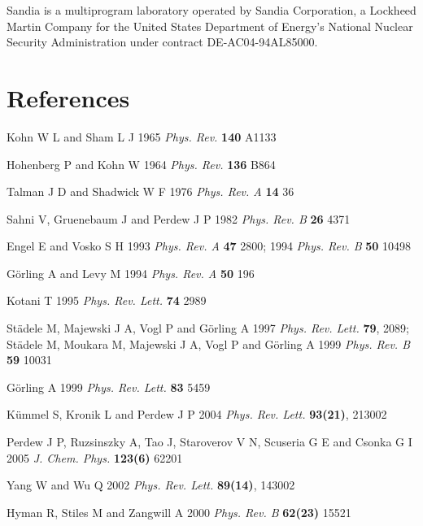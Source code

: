 \documentclass[12pt]{iopart}
\begin{document}
Sandia is a multiprogram laboratory operated by Sandia Corporation, a
Lockheed Martin Company for the United States Department of Energy's
National Nuclear Security Administration under contract DE-AC04-94AL85000.


%
%

\section*{References}

\begin{thebibliography}{14}

Kohn W L and Sham L J 1965 {\it Phys. Rev.} {\bf 140} A1133

Hohenberg P and Kohn W 1964 {\it Phys. Rev.} {\bf 136} B864

Talman J D and Shadwick W F 1976 {\it Phys. Rev. A} {\bf 14} 36

Sahni V, Gruenebaum J and Perdew J P 1982 {\it Phys. Rev. B} {\bf 26} 4371

Engel E and Vosko S H 1993 {\it Phys. Rev. A} {\bf 47} 2800;
1994 {\it Phys. Rev. B} {\bf 50} 10498

G\"{o}rling A and Levy M 1994 {\it Phys. Rev. A} {\bf 50} 196

Kotani T 1995 {\it Phys. Rev. Lett.} {\bf 74} 2989

St\"{a}dele M, Majewski J A, Vogl P and G\"{o}rling A 1997
{\it Phys. Rev. Lett.} {\bf 79}, 2089;
St\"{a}dele M, Moukara M, Majewski J A, Vogl P and G\"{o}rling A 1999
{\it Phys. Rev. B} {\bf 59} 10031

G\"{o}rling A 1999
{\it Phys. Rev. Lett.} {\bf 83} 5459

K\"{u}mmel S, Kronik L and Perdew J P 2004
{\it Phys. Rev. Lett.} {\bf 93(21)}, 213002

Perdew J P, Ruzsinszky A, Tao J, Staroverov V N, Scuseria G E and Csonka G I 2005
{\it J. Chem. Phys.} {\bf 123(6)} 62201

Yang W and Wu Q 2002
{\it Phys. Rev. Lett.} {\bf 89(14)}, 143002

Hyman R, Stiles M and Zangwill A 2000
{\it Phys. Rev. B} {\bf 62(23)} 15521


\end{thebibliography}
\end{document}

